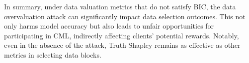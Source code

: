 In summary, under data valuation metrics that do not satisfy BIC, the data overvaluation attack can significantly impact data selection outcomes. 
This not only harms model accuracy but also leads to unfair opportunities for participating in CML, indirectly affecting clients' potential rewards.
Notably, even in the absence of the attack, Truth-Shapley remains as effective as other metrics in selecting data blocks.

